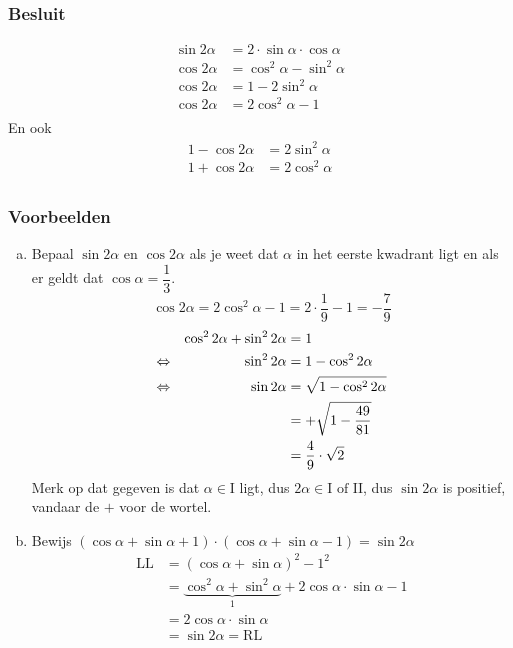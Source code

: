 \documentclass[a4paper,12pt]{article}
\begin{document}
\subsubsection*{Besluit}
\begin{align*}
  \sin 2\alpha &= 2\cdot\sin\alpha\cdot\cos\alpha\\
  \cos 2\alpha &= \cos^2\alpha -\sin^2\alpha\\
  \cos 2\alpha &= 1 - 2\sin^2\alpha\\
  \cos 2\alpha &= 2\cos^2\alpha - 1\\
\end{align*}
En ook
\begin{align*}
  1 - \cos 2\alpha &= 2\sin^2\alpha\\
  1 + \cos 2\alpha &= 2\cos^2\alpha \\
\end{align*}

\subsubsection*{Voorbeelden}
\begin{enumerate}[(a)]
  \item Bepaal $\sin 2\alpha$ en $\cos 2\alpha$ als je weet dat $\alpha$ in het eerste kwadrant ligt en als er geldt dat $\cos\alpha=\dfrac{1}{3}$.
    $$\cos 2\alpha = 2\cos^2\alpha - 1 = 2\cdot \dfrac{1}{9}-1=-\dfrac{7}{9}$$
    \begin{align*}
           && \cos^2 2\alpha + \sin^2 2\alpha &= 1\\
      \Leftrightarrow &&                  \sin^2 2\alpha &= 1 - \cos^2 2\alpha\\
      \Leftrightarrow &&                  \sin 2\alpha   &= \sqrt{1 - \cos^2 2\alpha}\\
           &&                                 &= + \sqrt{1 - \dfrac{49}{81}}\\
           &&                                 &= \dfrac{4}{9}\cdot\sqrt{2}
    \end{align*}
    Merk op dat gegeven is dat $\alpha\in\mbox{I}$ ligt, dus $2\alpha\in\mbox{I of II}$, dus $\sin 2\alpha$ is positief, vandaar de $+$ voor de wortel.
    \item Bewijs $(\cos \alpha + \sin \alpha + 1)\cdot(\cos\alpha + \sin\alpha - 1)=\sin 2\alpha$
    \begin{align*}
      \mbox{LL} &= (\cos\alpha + \sin\alpha)^2 - 1^2\\
                &= \underbrace{\cos^2\alpha + \sin^2\alpha}_1 + 2\cos\alpha\cdot\sin\alpha - 1\\
                &= 2\cos\alpha\cdot\sin\alpha\\
                &= \sin 2\alpha = \mbox{RL}
    \end{align*}
\end{enumerate}
\end{document}

